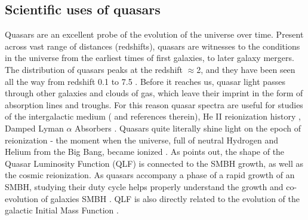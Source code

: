 \documentclass[modern]{aastex62}
\begin{document}
 

\subsection{Scientific uses of quasars}
Quasars are an excellent probe of the evolution of the universe over time. Present across vast range of distances (redshifts), quasars are witnesses to the conditions in the universe from the earliest times of first galaxies, to later galaxy mergers.  The distribution of quasars peaks at the redshift $\approx$2, and they have been seen all the way from redshift 0.1 to 7.5 \citep{paris2017, banados2018}. Before it reaches us, quasar light passes through other galaxies and clouds of gas, which leave their imprint  in the form of absorption lines and troughs.  For this reason quasar spectra are useful  for studies of the intergalactic medium (\cite{prochaska2014} and references therein),  He II reionization history \citep{khrykin2017}, Damped Lyman $\alpha$ Absorbers \citep{wolfe2005,murphy2016,parks2018}.  Quasars quite literally shine light on the epoch of reionization - the moment when the universe, full of neutral Hydrogen and Helium from the Big Bang, became ionized \citep{glikman2011, masters2012, ross2013}. As  \cite{alsayyad2016} points out, the shape of the Quasar Luminosity Function (QLF) is connected to the SMBH growth, as well as the cosmic reionization. As quasars accompany a phase of a rapid growth of an SMBH, studying their duty cycle helps properly understand the growth and co-evolution of  galaxies SMBH \citep{schawinski2012}.  QLF is also directly related to the evolution of the galactic Initial Mass Function \citep{mcgreer2013}. 
\end{document}
